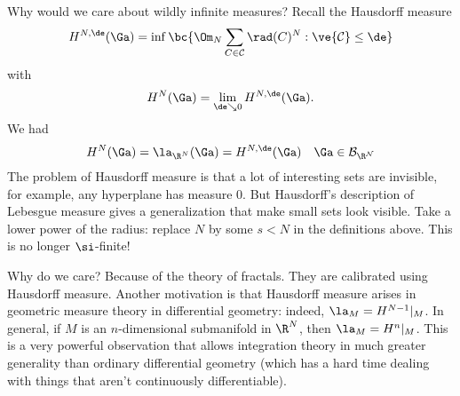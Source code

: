 Why would we care about wildly infinite measures? Recall the Hausdorff measure 
\begin{equation}\label{hauss1}
H^{N,\de}(\Ga)=\inf \bc{\Om_N\sum_{C\in \cal C}\rad(C)^N:\ve{\cal C}\le \de}
\end{equation}
with
\begin{equation}\label{hauss2}
H^N(\Ga)=\lim_{\de\searrow 0} H^{N,\de} (\Ga).
\end{equation}
We had
\[
H^N(\Ga)=\la_{\R^N} (\Ga)=H^{N,\de}(\Ga)\quad \Ga\in \cal B_{\R^N}
\]
The problem of Hausdorff measure is that a lot of interesting sets are invisible, for example, any hyperplane has measure 0. But Hausdorff's description of Lebesgue measure gives a generalization that make small sets look visible. Take a lower power of the radius: replace $N$ by some $s<N$ in the definitions above. This is no longer $\si$-finite!

Why do we care? Because of the theory of fractals. %
They are calibrated using Hausdorff measure. Another motivation is that Hausdorff measure arises in geometric measure theory in differential geometry:
indeed, $\la_M=H^{N-1}|_M$. 
In general, if $M$ is an $n$-dimensional submanifold in $\R^N$, then $\la_M=H^n|_M$. This is a very powerful observation that allows integration theory in much greater generality than ordinary differential geometry (which has a hard time dealing with things that aren't continuously differentiable). %